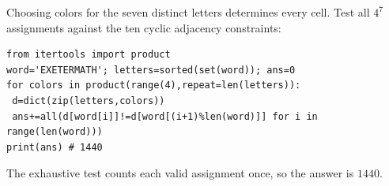 Choosing colors for the seven distinct letters determines every cell. Test all $4^7$ assignments against the ten cyclic adjacency constraints:\begin{verbatim}
from itertools import product
word='EXETERMATH'; letters=sorted(set(word)); ans=0
for colors in product(range(4),repeat=len(letters)):
 d=dict(zip(letters,colors))
 ans+=all(d[word[i]]!=d[word[(i+1)%len(word)]] for i in range(len(word)))
print(ans) # 1440
\end{verbatim}
The exhaustive test counts each valid assignment once, so the answer is $\boxed{1440}$.
